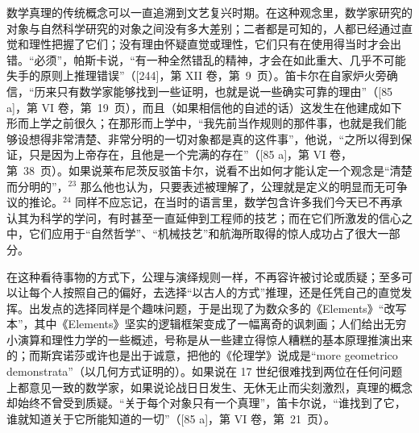 数学真理的传统概念可以一直追溯到文艺复兴时期。在这种观念里，数学家研究的对象与自然科学研究的对象之间没有多大差别；二者都是可知的，人都已经通过直觉和理性把握了它们；没有理由怀疑直觉或理性，它们只有在使用得当时才会出错。“必须”，帕斯卡说，“有一种全然错乱的精神，才会在如此重大、几乎不可能失手的原则上推理错误”（{[}244{]}，第 XII 卷，第~9~页）。笛卡尔在自家炉火旁确信，“历来只有数学家能够找到一些证明，也就是说一些确实可靠的理由”（{[}85 a{]}，第 VI 卷，第~19~页），而且（如果相信他的自述的话）这发生在他建成如下形而上学之前很久；在那形而上学中，“我先前当作规则的那件事，也就是我们能够设想得非常清楚、非常分明的一切对象都是真的这件事”，他说，“之所以得到保证，只是因为上帝存在，且他是一个完满的存在”（{[}85 a{]}，第 VI 卷，第~38~页）。如果说莱布尼茨反驳笛卡尔，说看不出如何才能认定一个观念是“清楚而分明的”，\(^{23}\) 那么他也认为，只要表述被理解了，公理就是定义的明显而无可争议的推论。\(^{24}\) 同样不应忘记，在当时的语言里，数学包含许多我们今天已不再承认其为科学的学问，有时甚至一直延伸到工程师的技艺；而在它们所激发的信心之中，它们应用于“自然哲学”、“机械技艺”和航海所取得的惊人成功占了很大一部分。

在这种看待事物的方式下，公理与演绎规则一样，不再容许被讨论或质疑；至多可以让每个人按照自己的偏好，去选择“以古人的方式”推理，还是任凭自己的直觉发挥。出发点的选择同样是个趣味问题，于是出现了为数众多的《Elements》“改写本”，其中《Elements》坚实的逻辑框架变成了一幅离奇的讽刺画；人们给出无穷小演算和理性力学的一些概述，号称是从一些建立得惊人糟糕的基本原理推演出来的；而斯宾诺莎或许也是出于诚意，把他的《伦理学》说成是“more geometrico demonstrata”（以几何方式证明的）。如果说在 17 世纪很难找到两位在任何问题上都意见一致的数学家，如果说论战日日发生、无休无止而尖刻激烈，真理的概念却始终不曾受到质疑。“关于每个对象只有一个真理”，笛卡尔说，“谁找到了它，谁就知道关于它所能知道的一切”（{[}85 a{]}，第 VI 卷，第~21~页）。

